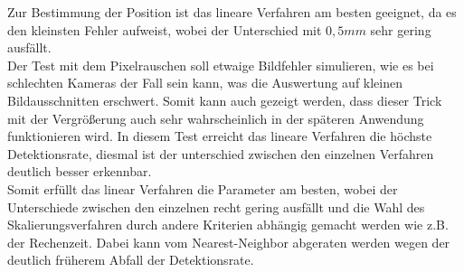 Zur Bestimmung der Position ist das lineare Verfahren am besten geeignet, da es den kleinsten Fehler aufweist, wobei der Unterschied mit $0,5mm$ sehr gering ausfällt.\\
Der Test mit dem Pixelrauschen soll etwaige Bildfehler simulieren, wie es bei schlechten Kameras der Fall sein kann, was die Auswertung auf kleinen Bildausschnitten erschwert. Somit kann auch gezeigt werden, dass dieser Trick mit der Vergrößerung auch sehr wahrscheinlich in der späteren Anwendung funktionieren wird. In diesem Test erreicht das lineare Verfahren die höchste Detektionsrate, diesmal ist der unterschied zwischen den einzelnen Verfahren deutlich besser erkennbar.\\
Somit erfüllt das linear Verfahren die Parameter am besten, wobei der Unterschiede zwischen den einzelnen recht gering ausfällt und die Wahl des Skalierungsverfahren durch andere Kriterien abhängig gemacht werden wie z.B. der Rechenzeit. Dabei kann vom Nearest-Neighbor abgeraten werden wegen der deutlich früherem Abfall der Detektionsrate.